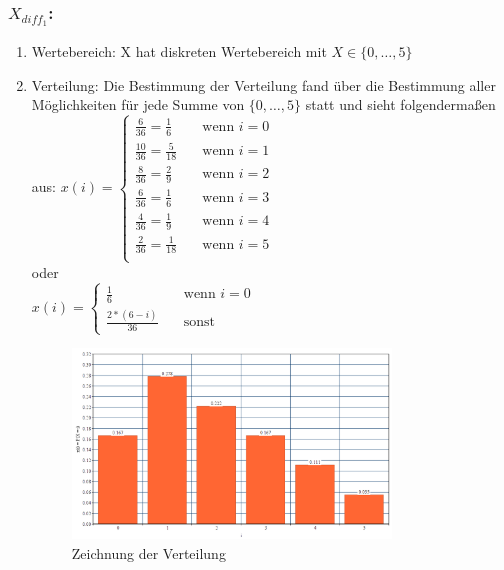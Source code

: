 \documentclass[%
10pt,              %
ngerman,           %
a4paper,           %
DIV11,             %
]{scrartcl}%
\begin{document}
\subsubsection*{$X_{diff_1}$:}

\begin{enumerate}
	\item Wertebereich: X hat diskreten Wertebereich mit $X \in \{0, \dots, 5 \}$
	\item Verteilung: Die Bestimmung der Verteilung fand über die Bestimmung aller Möglichkeiten für jede Summe von $\{0, \dots, 5 \}$ statt und sieht folgendermaßen aus:\newline
	$x(i) =
    \begin{cases}
        \frac{6}{36} = \frac{1}{6} & \quad \text{wenn } i = 0\\
        \frac{10}{36} = \frac{5}{18} & \quad \text{wenn } i = 1\\
        \frac{8}{36} = \frac{2}{9} & \quad \text{wenn } i = 2\\
        \frac{6}{36} = \frac{1}{6} & \quad \text{wenn } i = 3\\
        \frac{4}{36} = \frac{1}{9} & \quad \text{wenn } i = 4\\
        \frac{2}{36} = \frac{1}{18} & \quad \text{wenn } i = 5\\
    \end{cases}
    $
    \\
    oder 
    \\
    $x(i) =
    \begin{cases}
        \frac{1}{6} & \quad \text{wenn } i = 0\\
        \frac{2 * (6 - i)}{36} & \quad \text{sonst }
    \end{cases}
    $ \\
     
    \begin{figure}[!htbp]
      \centering
        \caption{Zeichnung der Verteilung}
        \includegraphics[width=0.8\textwidth]{xdiff1vert}
    \end{figure}
	

\end{enumerate}
\end{document}
